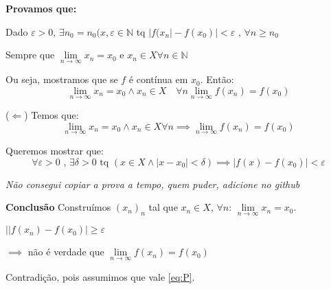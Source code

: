 \documentclass[12pt]{article}
\begin{document}
     \textbf{Provamos que: } 
     
     Dado $\varepsilon > 0$, $\exists n_0 = n_0(x, \varepsilon \in \mathbb{N}$ tq $|f(x_n| - f(x_0)| < \varepsilon \text{ , } \forall n \geq n_0$

     Sempre que $\lim \limits_{n \to \infty} x_n = x_0$ e $x_n \in X \forall n \in \mathbb{N}$

     Ou seja, mostramos que se $f$ é contínua em $x_0$. Então:
     \begin{equation*}
         \lim_{{n \to \infty}} x_n = x_0 \land x_n \in X \quad \forall n \lim_{{n \to \infty}} f(x_n) = f(x_0)
     \end{equation*}

     ($\Longleftarrow$) Temos que: 
     \begin{equation}
         \lim \limits_{n \to \infty} x_n = x_0 \land x_n \in X \forall n \implies \lim \limits_{n \to \infty} f(x_n) = f(x_0)
         \label{eq:P}
     \end{equation}

     Queremos mostrar que: 
     \begin{equation}
         \forall \varepsilon > 0 \text{ , } \exists \delta > 0 \text{ tq } \left( x \in X \land |x - x_0| < \delta \right) \implies |f(x) - f(x_0)| < \varepsilon
         \label{eq:Q}
     \end{equation}

    \textit{Não consegui copiar a prova a tempo, quem puder, adicione no github}

    \textbf{Conclusão} Construímos $(x_n)_n$ tal que $x_n \in X$, $\forall n$:  $\lim \limits_{n \to \infty} x_n = x_0$.

    $||f(x_n) - f(x_0) | \geq \varepsilon$

    $\implies $ não é verdade que $\lim \limits_{n \to \infty} f(x_n) = f(x_0)$

    Contradição, pois assumimos que vale \ref{eq:P}.
\end{document}
